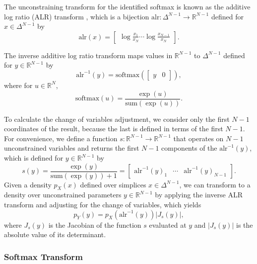 \documentclass[11pt]{article}
\newcommand{\abs}[1]{\left| #1 \right|}
\newcommand{\absdet}[1]{\abs{#1}}
\begin{document}
The unconstraining transform for the identified softmax is known as
the additive log ratio (ALR) transform
\cite{aitchison1982statistical}, which is a bijection
$\textrm{alr}:\Delta^{N-1} \rightarrow \mathbb{R}^{N-1}$ defined for
$x \in \Delta^{N-1}$ by
\[
  \textrm{alr}(x)
  = \begin{bmatrix}\displaystyle
    \log \frac{x_1}{x_N} \cdots \log \frac{x_{N-1}}{x_N}
  \end{bmatrix}.
\]

The inverse additive log ratio transform maps values in
$\mathbb{R}^{N-1}$ to $\Delta^{N-1}$ defined for $y \in
\mathbb{R}^{N-1}$ by
\[
  \textrm{alr}^{-1}(y)
  = \textrm{softmax}(\begin{bmatrix} y &  0 \end{bmatrix}),
\]
where for $u \in \mathbb{R}^N$,
\[
  \textrm{softmax}(u) = \frac{\exp(u)}{\textrm{sum}(\exp(u))}.
\]

To calculate the change of variables adjustment, we consider only the
first $N-1$ coordinates of the result, because the last is defined in
terms of the first $N-1$.  For convenience, we define a function 
$s:\mathbb{R}^{N-1} \rightarrow \mathbb{R}^{N-1}$ that operates on
$N-1$ unconstrained variables and returns the first $N-1$ components
of the $\textrm{alr}^{-1}(y)$, which is
defined for $y \in \mathbb{R}^{N-1}$ by
\[
  s(y) = \frac{\exp(y)}{\textrm{sum}(\exp(y)) + 1}
  = \begin{bmatrix}
    \textrm{alr}^{-1}(y)_1
    & \cdots &
    \textrm{alr}^{-1}(y)_{N-1}
    \end{bmatrix}.
\]
Given a density $p_X(x)$ defined over simplices $x \in \Delta^{N-1}$,
we can transform to a density over unconstrained parameters $y \in
\mathbb{R}^{N-1}$ by applying the inverse ALR transform and adjusting
for the change of variables, which yields
\[
  p_Y(y) = p_X(\textrm{alr}^{-1}(y)) \absdet{J_{s}(y)},
\]
where $J_{s}(y)$ is the Jacobian of the function $s$ evaluated at $y$
and $\absdet{J_s(y)}$ is the absolute value of its determinant.


\subsubsection{Softmax Transform}
\end{document}
